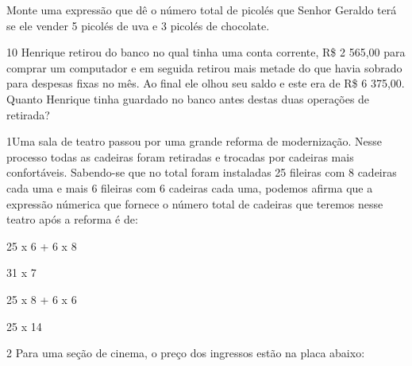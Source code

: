 {\begin{escolha}

\item
  Monte uma expressão que dê o número total de picolés que Senhor
  Geraldo terá se ele vender 5 picolés de uva e 3 picolés de chocolate.

\end{escolha}


\num{10} Henrique retirou do banco no qual tinha uma conta corrente, R\$ 2
565,00 para comprar um computador e em seguida retirou mais metade do
que havia sobrado para despesas fixas no mês. Ao final ele olhou seu
saldo e este era de R\$ 6 375,00. Quanto Henrique tinha guardado no
banco antes destas duas operações de retirada?




\num{1}Uma sala de teatro passou por uma grande reforma de modernização.
Nesse processo todas as cadeiras foram retiradas e trocadas por cadeiras
mais confortáveis. Sabendo-se que no total foram instaladas 25 fileiras
com 8 cadeiras cada uma e mais 6 fileiras com 6 cadeiras cada uma,
podemos afirma que a expressão númerica que fornece o número total de
cadeiras que teremos nesse teatro após a reforma é de:

\begin{escolha}
\item
  25 x 6 + 6 x 8
\item
  31 x 7
\item
  25 x 8 + 6 x 6
\item
  25 x 14
\end{escolha}



\num{2} Para uma seção de cinema, o preço dos ingressos estão na placa
abaixo:


}
